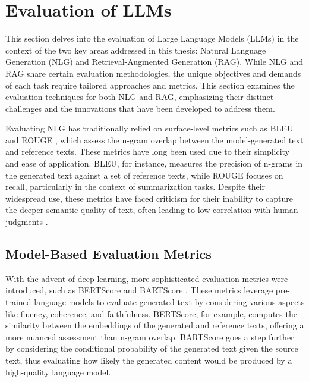 
\section{Evaluation of LLMs}


This section delves into the evaluation of Large Language Models (LLMs) in the context of the two key areas addressed in this thesis: Natural Language Generation (NLG) and Retrieval-Augmented Generation (RAG). While NLG and RAG share certain evaluation methodologies, the unique objectives and demands of each task require tailored approaches and metrics. This section examines the evaluation techniques for both NLG and RAG, emphasizing their distinct challenges and the innovations that have been developed to address them.

Evaluating NLG has traditionally relied on surface-level metrics such as BLEU \cite{papineni2002bleu} and ROUGE \cite{lin2004rouge}, which assess the n-gram overlap between the model-generated text and reference texts. These metrics have long been used due to their simplicity and ease of application. BLEU, for instance, measures the precision of n-grams in the generated text against a set of reference texts, while ROUGE focuses on recall, particularly in the context of summarization tasks. Despite their widespread use, these metrics have faced criticism for their inability to capture the deeper semantic quality of text, often leading to low correlation with human judgments \cite{sulem2018bleu}.

\subsection{Model-Based Evaluation Metrics}

With the advent of deep learning, more sophisticated evaluation metrics were introduced, such as BERTScore and BARTScore \cite{zhang2019bertscore, yuan2021bartscore}. These metrics leverage pre-trained language models to evaluate generated text by considering various aspects like fluency, coherence, and faithfulness. BERTScore, for example, computes the similarity between the embeddings of the generated and reference texts, offering a more nuanced assessment than n-gram overlap. BARTScore goes a step further by considering the conditional probability of the generated text given the source text, thus evaluating how likely the generated content would be produced by a high-quality language model.

